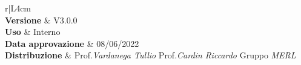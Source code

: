 \begin{center}
	\begin{tabular}{r|L{4cm}}
		 \\
		\hline
		\textbf{Versione}			& V3.0.0 \\
		\textbf{Uso}		& Interno \\
		\textbf{Data approvazione} 			& 08/06/2022 \\
		\textbf{Distribuzione} 	&	Prof.\textit{Vardanega Tullio} \newline Prof.\textit{Cardin Riccardo} \newline Gruppo \textit{MERL} \\
	\end{tabular}
\end{center}
